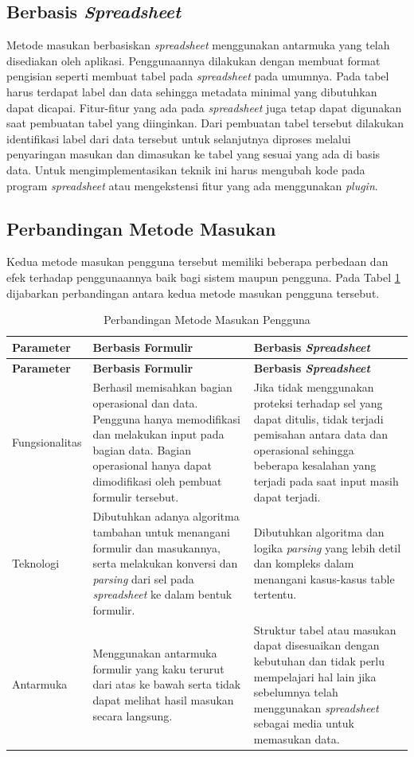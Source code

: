 	\subsection{Berbasis \textit{Spreadsheet}}
	Metode masukan berbasiskan \textit{spreadsheet} menggunakan antarmuka yang telah disediakan oleh aplikasi. Penggunaannya dilakukan dengan membuat format pengisian seperti membuat tabel pada \textit{spreadsheet} pada umumnya. Pada tabel harus terdapat label dan data sehingga metadata minimal yang dibutuhkan dapat dicapai. Fitur-fitur yang ada pada \textit{spreadsheet} juga tetap dapat digunakan saat pembuatan tabel yang diinginkan. Dari pembuatan tabel tersebut dilakukan identifikasi label dari data tersebut untuk selanjutnya diproses melalui penyaringan masukan dan dimasukan ke tabel yang sesuai yang ada di basis data. Untuk mengimplementasikan teknik ini harus mengubah kode pada program \textit{spreadsheet} atau mengekstensi fitur yang ada menggunakan \textit{plugin}. 

	\subsection{Perbandingan Metode Masukan}
	Kedua metode masukan pengguna tersebut memiliki beberapa perbedaan dan efek terhadap penggunaannya baik bagi sistem maupun pengguna. Pada Tabel \ref{ModelInteraksi} dijabarkan perbandingan antara kedua metode masukan pengguna tersebut.

	\begin{longtable}{ | p{3cm} | p{4cm} | p{4cm} | }
	    \caption{Perbandingan Metode Masukan Pengguna}
	    \label{ModelInteraksi}\\ \hline
	    \centering\bfseries{Parameter} & \centering\bfseries{Berbasis Formulir} & \centering\bfseries{Berbasis \textit{Spreadsheet}} \tabularnewline \hline
	    \endfirsthead
	    \hline
	    \centering\bfseries{Parameter} & \centering\bfseries{Berbasis Formulir} & \centering\bfseries{Berbasis \textit{Spreadsheet}} \tabularnewline \hline
	    \endhead
	    Fungsionalitas & Berhasil memisahkan bagian operasional dan data. Pengguna hanya memodifikasi dan melakukan input pada bagian data. Bagian operasional hanya dapat dimodifikasi oleh pembuat formulir tersebut. & Jika tidak menggunakan proteksi terhadap sel yang dapat ditulis, tidak terjadi pemisahan antara data dan operasional sehingga beberapa kesalahan yang terjadi pada saat input masih dapat terjadi. \\ \hline
	    Teknologi & Dibutuhkan adanya algoritma tambahan untuk menangani formulir dan masukannya, serta melakukan konversi dan \textit{parsing} dari sel pada \textit{spreadsheet} ke dalam bentuk formulir. & Dibutuhkan algoritma dan logika \textit{parsing} yang lebih detil dan kompleks dalam menangani kasus-kasus table tertentu. \\ \hline
	    Antarmuka & Menggunakan antarmuka formulir yang kaku terurut dari atas ke bawah serta tidak dapat melihat hasil masukan secara langsung. & Struktur tabel atau masukan dapat disesuaikan dengan kebutuhan dan tidak perlu mempelajari hal lain jika sebelumnya telah menggunakan \textit{spreadsheet} sebagai media untuk memasukan data. \\ \hline
  	\end{longtable}

